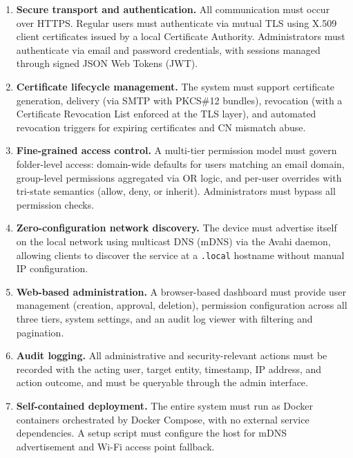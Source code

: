 \documentclass[12pt,letterpaper]{report}
\begin{document}
\begin{enumerate}
    \item \textbf{Secure transport and authentication.} All communication must occur over HTTPS. Regular users must authenticate via mutual TLS using X.509 client certificates issued by a local Certificate Authority. Administrators must authenticate via email and password credentials, with sessions managed through signed JSON Web Tokens (JWT).

    \item \textbf{Certificate lifecycle management.} The system must support certificate generation, delivery (via SMTP with PKCS\#12 bundles), revocation (with a Certificate Revocation List enforced at the TLS layer), and automated revocation triggers for expiring certificates and CN mismatch abuse.

    \item \textbf{Fine-grained access control.} A multi-tier permission model must govern folder-level access: domain-wide defaults for users matching an email domain, group-level permissions aggregated via OR logic, and per-user overrides with tri-state semantics (allow, deny, or inherit). Administrators must bypass all permission checks.

    \item \textbf{Zero-configuration network discovery.} The device must advertise itself on the local network using multicast DNS (mDNS) via the Avahi daemon, allowing clients to discover the service at a \texttt{.local} hostname without manual IP configuration.

    \item \textbf{Web-based administration.} A browser-based dashboard must provide user management (creation, approval, deletion), permission configuration across all three tiers, system settings, and an audit log viewer with filtering and pagination.

    \item \textbf{Audit logging.} All administrative and security-relevant actions must be recorded with the acting user, target entity, timestamp, IP address, and action outcome, and must be queryable through the admin interface.

    \item \textbf{Self-contained deployment.} The entire system must run as Docker containers orchestrated by Docker Compose, with no external service dependencies. A setup script must configure the host for mDNS advertisement and Wi-Fi access point fallback.
\end{enumerate}
\end{document}

